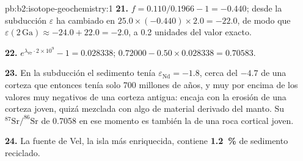 \begin{solution}{pb:b2:isotope-geochemistry:1}
\textbf{21.} $f = 0.110/0.1966 - 1 = -0.440$; desde la subducción $\varepsilon$ ha cambiado en
$25.0\times(-0.440)\times2.0 = -22.0$, de modo que $\varepsilon(2\,\mathrm{Ga}) \approx -24.0 + 22.0
= -2.0$, a 0.2 unidades del valor exacto.

\textbf{22.} $e^{\lambda_{87}\cdot2\times10^9} - 1 = 0.028338$;
$0.72000 - 0.50\times0.028338 = 0.70583$.

\textbf{23.} En la subducción el sedimento tenía $\varepsilon_{\mathrm{Nd}} = -1.8$, cerca del
$-4.7$ de una corteza que entonces tenía solo 700 millones de años, y muy por encima de los
valores muy negativos de una corteza antigua: encaja con la erosión de una corteza joven, quizá
mezclada con algo de material derivado del manto. Su $^{87}\mathrm{Sr}/^{86}\mathrm{Sr}$ de
0.7058 en ese momento es también la de una roca cortical joven.

\textbf{24.} La fuente de Vel, la isla más enriquecida, contiene
\textbf{\qty[text-series-to-math=true]{1.2}{\percent}} de sedimento reciclado.
\end{solution}
